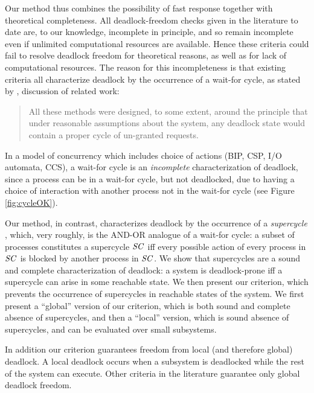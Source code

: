 Our method thus combines the possibility of fast response together with theoretical completeness.
All deadlock-freedom checks given in the literature to date are, to our knowledge, incomplete in
principle, and so remain incomplete even if unlimited computational resources are available.
Hence these criteria could fail to resolve deadlock freedom for theoretical reasons, as well as for 
lack of computational resources.
%
The reason for this incompleteness is that existing criteria all characterize deadlock by the
occurrence of a wait-for cycle, \eg as stated by , discussion of related
work:
\begin{quote}
All these methods were designed, to some extent, around the principle that under reasonable
assumptions about the system, any deadlock state would contain a proper cycle of un-granted requests.
\end{quote}
In a model of concurrency which includes choice of actions
(\eg BIP, CSP, I/O automata, CCS), a wait-for cycle is an \emph{incomplete} characterization of
deadlock, since a process can be in a wait-for cycle, but not deadlocked, due to having a choice of
interaction with another process not in the wait-for cycle (see Figure \ref{fig:cycleOK}).

Our method, in contrast, characterizes deadlock by the occurrence of a \emph{supercycle} \cite{AE98,AC05}, which, very roughly, is the AND-OR analogue
of a wait-for cycle: a subset of processes constitutes a supercycle $\mathit{SC}$ iff every possible action of every process in $\mathit{SC}$ is blocked by another
process in $\mathit{SC}$.
%
We show that supercycles are a sound and complete characterization of deadlock: a system is deadlock-prone iff a supercycle can arise in some
reachable state.
%
We then present our criterion, which prevents the occurrence of supercycles in reachable states of
the system. We first present a ``global'' version of our criterion, which is both sound and complete
\wrt absence of supercycles, and then a ``local'' version, which is sound \wrt absence of
supercycles, and can be evaluated over small subsystems.

In addition our criterion guarantees freedom from local (and therefore global) deadlock. A local deadlock occurs when 
a subsystem is deadlocked while the rest of the system can execute. Other criteria in the literature \cite{AGR16,Ma96,RD87,DFinder2,BR91,MM12,GS03,AB03} guarantee only global deadlock freedom.

